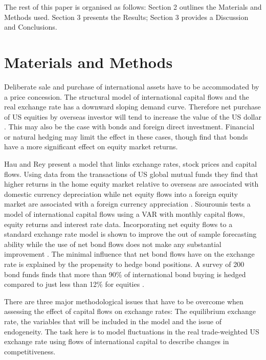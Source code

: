 \documentclass[jrfm,communication,submit,moreauthors,pdftex]{Definitions/mdpi}
\begin{document}
The rest of this paper is organised as follows: Section 2 outlines the Materials and Methods used.   Section 3 presents the Results; Section 3 provides a Discussion and Conclusions. 
 
\section{Materials and Methods}

Deliberate sale and purchase of international assets have to be accommodated by a price concession.  The structural model of international capital flows and the real exchange rate has a downward sloping demand curve. Therefore net purchase of US equities by overseas investor will tend to increase the value of the US dollar \citet{HauEquity}.  This may also be the case with bonds and foreign direct investment. Financial or natural hedging may limit the effect in these cases, though \citet{BathiaBourasDemirerGupta} find that bonds have a more significant effect on equity market returns. 

Hau and Rey present a model that links exchange rates, stock prices and capital flows.  Using data from the transactions of US global mutual funds they find that higher returns in the home equity market relative to overseas are associated with domestic currency depreciation while net equity flows into a foreign equity market are associated with a foreign currency appreciation \citep{HauEquity}.  Siourounis tests a model of international capital flows using a VAR with monthly capital flows, equity returns and interest rate data.  Incorporating net equity flows to a standard exchange rate model is shown to improve the out of sample forecasting ability while the use of net bond flows does not make any substantial improvement \citep{Siourounis2004Capital}.   The minimal influence that net bond flows have on the exchange rate is explained by the propensity to hedge bond positions.  A survey of 200 bond funds finds that more than 90\% of international bond buying is hedged compared to just less than 12\% for equities \citep[p. 3]{Siourounis2004Capital}.  

There are three major methodological issues that have to be overcome when assessing the effect of capital flows on exchange rates: The equilibrium exchange rate, the variables that will be included in the model and the issue of endogeneity. The task here is to model fluctuations in the real trade-weighted US exchange rate using flows of international capital to describe changes in competitiveness.
\end{document}

